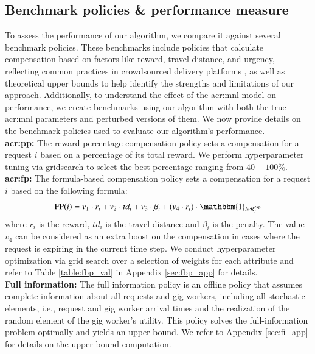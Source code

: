 \subsection{Benchmark policies \& performance measure}
\label{sec:benchmarks}
To assess the performance of our algorithm, we compare it against several benchmark policies. These benchmarks include policies that calculate compensation based on factors like reward, travel distance, and urgency, reflecting common practices in crowdsourced delivery platforms \citep{alnaggar2021crowdsourced}, as well as theoretical upper bounds to help identify the strengths and limitations of our approach. Additionally, to understand the effect of the \gls{acr:mnl} model on performance, we create benchmarks using our algorithm with both the true \gls{acr:mnl} parameters and perturbed versions of them. We now provide details on the benchmark policies used to evaluate our algorithm’s performance. 
~\\
\textbf{\gls{acr:pp}:} The reward percentage compensation policy sets a compensation for a request $i$ based on a percentage of its total reward. We perform hyperparameter tuning via gridsearch to select the best percentage ranging from $40-100\%$. 
~\\
\textbf{\gls{acr:fp}:} The formula-based compensation policy sets a compensation for a request $i$ based on the following formula:
\begin{align}
\text{FP}(i) = v_1 \cdot r_i + v_2 \cdot td_i + v_3 \cdot \beta_i + (v_4 \cdot r_i) \cdot \mathbbm{1}_{i \in \mathcal{R}\hspace{0.05em}_t^{\mathrm{exp}}}
\end{align}
where $r_i$ is the reward, $td_i$ is the travel distance and $\beta_i$ is the penalty. The value $v_4$ can be considered as an extra boost on the compensation in cases where the request is expiring in the current time step. 
We conduct hyperparameter optimization via grid search over a selection of weights for each attribute and refer to Table \ref{table:fbp_val} in Appendix \ref{sec:fbp_app} for details.
~\\
\textbf{Full information:} The full information policy is an offline policy that assumes complete information about all requests and gig workers, including all stochastic elements, i.e., request and gig worker arrival times and the realization of the random element of the gig worker's utility. This policy solves the full-information problem optimally and yields an upper bound. We refer to Appendix \ref{sec:fi_app} for details on the upper bound computation. 
